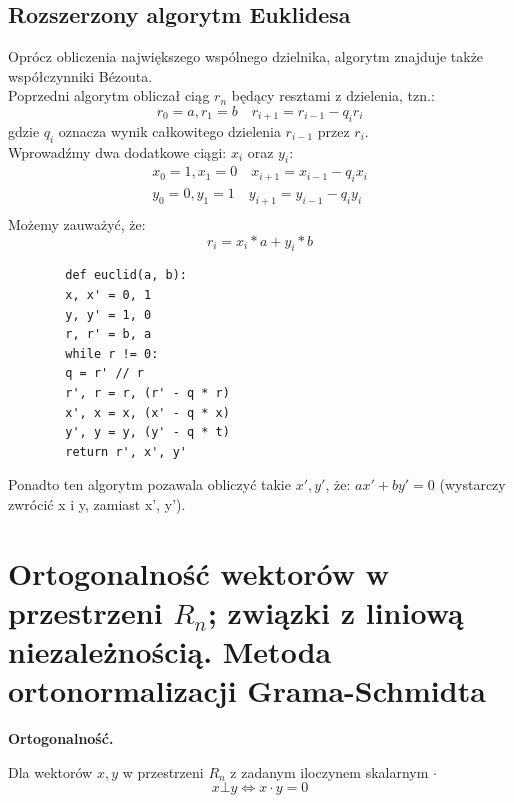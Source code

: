 \documentclass[12pt]{article}
\begin{document}
    \subsection{Rozszerzony algorytm Euklidesa}
    Oprócz obliczenia największego wspólnego dzielnika, algorytm znajduje także współczynniki Bézouta. \\
    Poprzedni algorytm obliczał ciąg $r_n$ będący resztami z dzielenia, tzn.:
    \[ r_0 = a, r_1 = b \quad r_{i + 1} = r_{i - 1} - q_{i}r_{i}\]
    gdzie $q_{i}$ oznacza wynik całkowitego dzielenia $r_{i - 1}$ przez $r_i$. \\
    Wprowadźmy dwa dodatkowe ciągi: $x_{i}$ oraz $y_i$:
    \begin{gather*}
        x_0 = 1, x_1 = 0 \quad x_{i + 1} = x_{i - 1} - q_{i}x_{i}\\
        y_0 = 0, y_1 = 1 \quad y_{i + 1} = y_{i - 1} - q_{i}y_{i}\\
    \end{gather*}
    Możemy zauważyć, że:
    \[r_i = x_i * a + y_i * b\]
    \begin{verbatim}
        def euclid(a, b):
        x, x' = 0, 1
        y, y' = 1, 0
        r, r' = b, a
        while r != 0:
        q = r' // r
        r', r = r, (r' - q * r)
        x', x = x, (x' - q * x)
        y', y = y, (y' - q * t)
        return r', x', y'
    \end{verbatim}
    Ponadto ten algorytm pozawala obliczyć takie $x', y'$, że: $ax' + by' = 0$ (wystarczy zwrócić x i y, zamiast x', y').

    \newpage

    \section{Ortogonalność wektorów w przestrzeni $R_n$; związki z liniową niezależnością. Metoda ortonormalizacji Grama-Schmidta}

    \begin{definition}
        \textbf{Ortogonalność.}

        Dla wektorów $x, y$ w przestrzeni $R_n$ z zadanym iloczynem skalarnym $\cdot$
        \[x \bot y \Leftrightarrow x \cdot y = 0 \]

    \end{definition}
\end{document}
